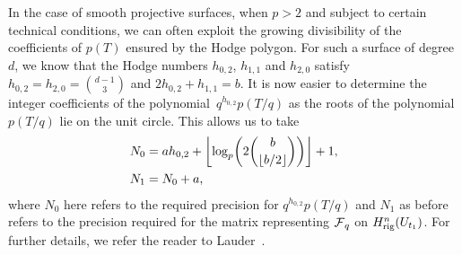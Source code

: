 \begin{rem} \label{rem:N0Surfaces}
In the case of smooth projective surfaces, when $p > 2$ and subject to 
certain technical conditions, we can often exploit the growing divisibility 
of the coefficients of $p(T)$ ensured by the Hodge polygon.  For such a surface 
of degree~$d$, we know that the Hodge numbers $h_{0,2}$, $h_{1,1}$ and $h_{2,0}$ 
satisfy $h_{0,2} = h_{2,0} = \binom{d-1}{3}$ and $2 h_{0,2} + h_{1,1} = b$. 
It is now easier to determine the integer coefficients of the 
polynomial~$q^{h_{0,2}} p(T/q)$ as the roots of the polynomial $p(T/q)$ lie 
on the unit circle.  This allows us to take 
\begin{align*}
N_0 & = a h_{0,2} + \left\lfloor\log_p \biggl( 2 \binom{b}{\left\lfloor b/2\right\rfloor}\biggr)\right\rfloor + 1,\\
N_1 & = N_0 + a,
\end{align*}
where $N_0$ here refers to the required precision for $q^{h_{0,2}} p(T/q)$ 
and $N_1$ as before refers to the precision required for the matrix 
representing $\operatorname{\mathcal{F}}_q$ on $H_{\text{rig}}^{n}(U_{t_1})$.
For further details, we refer the reader to 
Lauder~\citep[\S 9.3.2, Proposition~9.6]{Lauder2006}.
\end{rem}

